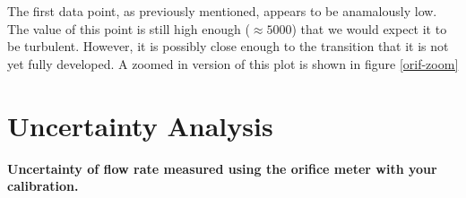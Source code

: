 \documentclass{article}
\begin{document}
The first data point, as previously mentioned, appears to be anamalously low. The value of this point is 
still high enough ($\approx 5000$) that we would expect it to be turbulent. However, it is possibly close enough 
to the transition that it is not yet fully developed. A zoomed in version of this plot is shown in figure \ref{orif-zoom}

\newpage
\section{Uncertainty Analysis}

\textbf{Uncertainty of flow rate measured using the orifice meter with
your calibration.} 
\end{document}
